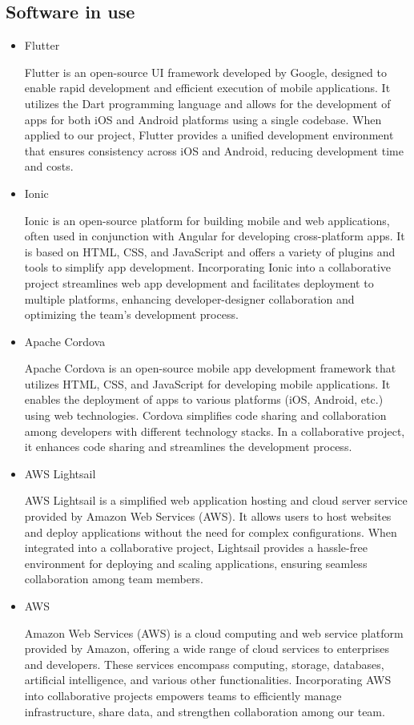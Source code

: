 \documentclass[conference]{IEEEtran}
\begin{document}
\subsection{Software in use}
\begin{itemize}
    \item Flutter \par 
    Flutter is an open-source UI framework developed by Google, designed to enable rapid development and efficient execution of mobile applications. It utilizes the Dart programming language and allows for the development of apps for both iOS and Android platforms using a single codebase. When applied to our project, Flutter provides a unified development environment that ensures consistency across iOS and Android, reducing development time and costs.
    \item Ionic \par
    Ionic is an open-source platform for building mobile and web applications, often used in conjunction with Angular for developing cross-platform apps. It is based on HTML, CSS, and JavaScript and offers a variety of plugins and tools to simplify app development. Incorporating Ionic into a collaborative project streamlines web app development and facilitates deployment to multiple platforms, enhancing developer-designer collaboration and optimizing the team's development process.
     \item Apache Cordova \par
    Apache Cordova is an open-source mobile app development framework that utilizes HTML, CSS, and JavaScript for developing mobile applications. It enables the deployment of apps to various platforms (iOS, Android, etc.) using web technologies. Cordova simplifies code sharing and collaboration among developers with different technology stacks. In a collaborative project, it enhances code sharing and streamlines the development process.
     \item AWS Lightsail \par
    AWS Lightsail is a simplified web application hosting and cloud server service provided by Amazon Web Services (AWS). It allows users to host websites and deploy applications without the need for complex configurations. When integrated into a collaborative project, Lightsail provides a hassle-free environment for deploying and scaling applications, ensuring seamless collaboration among team members.
     \item AWS \par
    Amazon Web Services (AWS) is a cloud computing and web service platform provided by Amazon, offering a wide range of cloud services to enterprises and developers. These services encompass computing, storage, databases, artificial intelligence, and various other functionalities. Incorporating AWS into collaborative projects empowers teams to efficiently manage infrastructure, share data, and strengthen collaboration among our  team.

\end{itemize}
\end{document}
